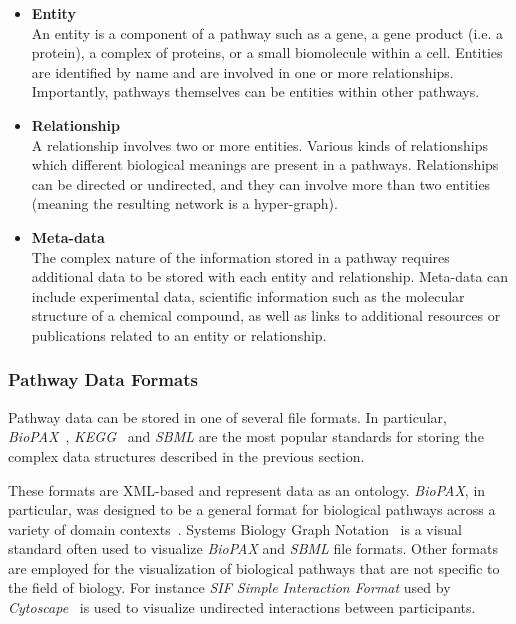 \documentclass{egpubl}
\begin{document}
\begin{itemize}

\item \textbf{Entity}\\
An entity is a component of a pathway such as a gene, a gene product (i.e. a protein), a complex of proteins, or a small biomolecule within a cell.
Entities are identified by name and are involved in one or more relationships.
Importantly, pathways themselves can be entities within other pathways.
\item \textbf{Relationship}\\
A relationship involves two or more entities.
Various kinds of relationships which different biological meanings are present in a pathways.
Relationships can be directed or undirected, and they can involve more than two entities (meaning the resulting network is a hyper-graph).
\item \textbf{Meta-data}\\
The complex nature of the information stored in a pathway requires additional data to be stored with each entity and relationship.
Meta-data can include experimental data, scientific information such as the molecular structure of a chemical compound, as well as links to additional resources or publications related to an entity or relationship.

\end{itemize}


\subsubsection{Pathway Data Formats}

Pathway data can be stored in one of several file formats.
In particular, \textit{BioPAX}~\cite{demir2010biopax}, \textit{KEGG}~\cite{kanehisa2000kegg} and \textit{SBML} \cite{Hucka2003} are the most popular standards for storing the complex data structures described in the previous section.

These formats are XML-based and represent data as an ontology.
\emph{BioPAX}, in particular, was designed to be a general format for biological pathways across a variety of domain contexts~\cite{demir2010biopax}.
Systems Biology Graph Notation~\cite{Novere2009} is a visual standard often used to visualize \textit{BioPAX} and \textit{SBML} file formats.
Other formats are employed for the visualization of biological pathways that are not specific to the field of biology.
For instance \textit{SIF Simple Interaction Format} used by \textit{Cytoscape}~\cite{Shannon2003cytoscape} is used to visualize undirected interactions between participants.
\end{document}
